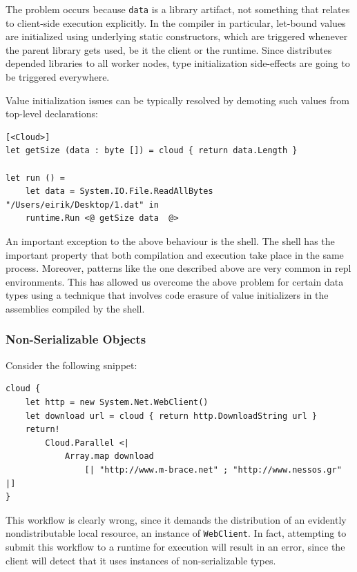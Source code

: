 The problem occurs because \texttt{data} is a library artifact, not something
that relates to client-side execution explicitly. In the \fsharp{} compiler in particular,
let-bound values are initialized using underlying static constructors, which are triggered
whenever the parent library gets used, be it the client or the runtime.
Since \mbrace{} distributes depended libraries to all worker nodes, type initialization 
side-effects are going to be triggered everywhere.

Value initialization issues can be typically resolved by demoting such values from top-level
declarations:
\begin{lstlisting}
[<Cloud>]
let getSize (data : byte []) = cloud { return data.Length }

let run () = 
	let data = System.IO.File.ReadAllBytes "/Users/eirik/Desktop/1.dat" in
	runtime.Run <@ getSize data  @>
\end{lstlisting}

An important exception to the above behaviour is the \mbrace{} shell. The shell has the 
important property that both compilation and execution take place in the same process. 
Moreover, patterns like the one described above are very common in repl environments.
This has allowed us overcome the above problem for certain data types using a technique
that involves code erasure of value initializers in the assemblies compiled by the shell.

\subsubsection*{Non-Serializable Objects}

\noindent Consider the following snippet:
\begin{lstlisting}
cloud {
	let http = new System.Net.WebClient()
	let download url = cloud { return http.DownloadString url }
	return! 
		Cloud.Parallel <| 
			Array.map download 
				[| "http://www.m-brace.net" ; "http://www.nessos.gr" |]
}
\end{lstlisting}
This workflow is clearly wrong, since it demands the distribution of an evidently
nondistributable local resource, an instance of \texttt{WebClient}.
In fact, attempting to submit this workflow to a runtime for execution will result in
an error, since the client will detect that it uses instances of non-serializable 
types.

